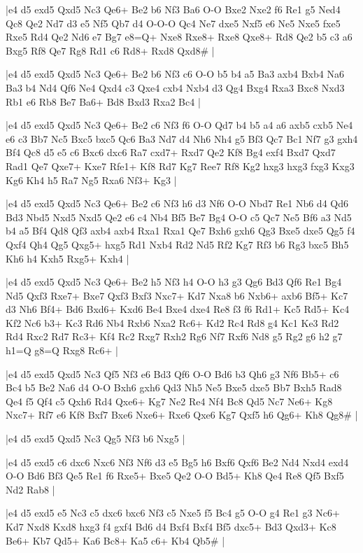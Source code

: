 \whitename{}
\blackname{}
\makegametitle
|e4 d5 exd5 Qxd5 Nc3 Qe6+ Be2 b6 Nf3 Ba6 O-O Bxe2 Nxe2 f6 Re1 g5 Ned4 Qc8 Qe2 Nd7 d3 e5 Nf5 Qb7 d4 O-O-O Qc4 Ne7 dxe5 Nxf5 e6 Ne5 Nxe5 fxe5 Rxe5 Rd4 Qe2 Nd6 e7 Bg7 e8=Q+ Nxe8 Rxe8+ Rxe8 Qxe8+ Rd8 Qe2 b5 c3 a6 Bxg5 Rf8 Qe7 Rg8 Rd1 c6 Rd8+ Rxd8 Qxd8\#  |

\whitename{}
\blackname{}
\makegametitle
|e4 d5 exd5 Qxd5 Nc3 Qe6+ Be2 b6 Nf3 c6 O-O b5 b4 a5 Ba3 axb4 Bxb4 Na6 Ba3 b4 Nd4 Qf6 Ne4 Qxd4 c3 Qxe4 cxb4 Nxb4 d3 Qg4 Bxg4 Rxa3 Bxc8 Nxd3 Rb1 e6 Rb8 Be7 Ba6+ Bd8 Bxd3 Rxa2 Bc4  |

\whitename{}
\blackname{}
\makegametitle
|e4 d5 exd5 Qxd5 Nc3 Qe6+ Be2 c6 Nf3 f6 O-O Qd7 b4 b5 a4 a6 axb5 cxb5 Ne4 e6 c3 Bb7 Nc5 Bxc5 bxc5 Qc6 Ba3 Nd7 d4 Nh6 Nh4 g5 Bf3 Qc7 Bc1 Nf7 g3 gxh4 Bf4 Qc8 d5 e5 c6 Bxc6 dxc6 Ra7 cxd7+ Rxd7 Qe2 Kf8 Bg4 exf4 Bxd7 Qxd7 Rad1 Qe7 Qxe7+ Kxe7 Rfe1+ Kf8 Rd7 Kg7 Ree7 Rf8 Kg2 hxg3 hxg3 fxg3 Kxg3 Kg6 Kh4 h5 Ra7 Ng5 Rxa6 Nf3+ Kg3  |

\whitename{}
\blackname{}
\makegametitle
|e4 d5 exd5 Qxd5 Nc3 Qe6+ Be2 c6 Nf3 h6 d3 Nf6 O-O Nbd7 Re1 Nb6 d4 Qd6 Bd3 Nbd5 Nxd5 Nxd5 Qe2 e6 c4 Nb4 Bf5 Be7 Bg4 O-O c5 Qc7 Ne5 Bf6 a3 Nd5 b4 a5 Bf4 Qd8 Qf3 axb4 axb4 Rxa1 Rxa1 Qe7 Bxh6 gxh6 Qg3 Bxe5 dxe5 Qg5 f4 Qxf4 Qh4 Qg5 Qxg5+ hxg5 Rd1 Nxb4 Rd2 Nd5 Rf2 Kg7 Rf3 b6 Rg3 bxc5 Bh5 Kh6 h4 Kxh5 Rxg5+ Kxh4  |

\whitename{}
\blackname{}
\makegametitle
|e4 d5 exd5 Qxd5 Nc3 Qe6+ Be2 h5 Nf3 h4 O-O h3 g3 Qg6 Bd3 Qf6 Re1 Bg4 Nd5 Qxf3 Rxe7+ Bxe7 Qxf3 Bxf3 Nxc7+ Kd7 Nxa8 b6 Nxb6+ axb6 Bf5+ Kc7 d3 Nh6 Bf4+ Bd6 Bxd6+ Kxd6 Be4 Bxe4 dxe4 Re8 f3 f6 Rd1+ Kc5 Rd5+ Kc4 Kf2 Nc6 b3+ Kc3 Rd6 Nb4 Rxb6 Nxa2 Rc6+ Kd2 Rc4 Rd8 g4 Kc1 Ke3 Rd2 Rd4 Rxc2 Rd7 Rc3+ Kf4 Rc2 Rxg7 Rxh2 Rg6 Nf7 Rxf6 Nd8 g5 Rg2 g6 h2 g7 h1=Q g8=Q Rxg8 Rc6+  |

\whitename{}
\blackname{}
\makegametitle
|e4 d5 exd5 Qxd5 Nc3 Qf5 Nf3 e6 Bd3 Qf6 O-O Bd6 b3 Qh6 g3 Nf6 Bb5+ c6 Bc4 b5 Be2 Na6 d4 O-O Bxh6 gxh6 Qd3 Nh5 Ne5 Bxe5 dxe5 Bb7 Bxh5 Rad8 Qe4 f5 Qf4 c5 Qxh6 Rd4 Qxe6+ Kg7 Ne2 Re4 Nf4 Bc8 Qd5 Nc7 Ne6+ Kg8 Nxc7+ Rf7 e6 Kf8 Bxf7 Bxe6 Nxe6+ Rxe6 Qxe6 Kg7 Qxf5 h6 Qg6+ Kh8 Qg8\#  |

\whitename{}
\blackname{}
\makegametitle
|e4 d5 exd5 Qxd5 Nc3 Qg5 Nf3 b6 Nxg5  |

\whitename{}
\blackname{}
\makegametitle
|e4 d5 exd5 c6 dxc6 Nxc6 Nf3 Nf6 d3 e5 Bg5 h6 Bxf6 Qxf6 Be2 Nd4 Nxd4 exd4 O-O Bd6 Bf3 Qe5 Re1 f6 Rxe5+ Bxe5 Qe2 O-O Bd5+ Kh8 Qe4 Re8 Qf5 Bxf5 Nd2 Rab8  |

\whitename{}
\blackname{}
\makegametitle
|e4 d5 exd5 e5 Nc3 c5 dxc6 bxc6 Nf3 c5 Nxe5 f5 Bc4 g5 O-O g4 Re1 g3 Nc6+ Kd7 Nxd8 Kxd8 hxg3 f4 gxf4 Bd6 d4 Bxf4 Bxf4 Bf5 dxc5+ Bd3 Qxd3+ Kc8 Be6+ Kb7 Qd5+ Ka6 Bc8+ Ka5 c6+ Kb4 Qb5\#  |

